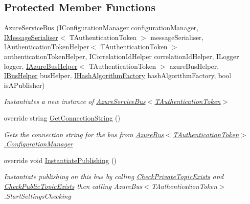 \subsection*{Protected Member Functions}
\begin{DoxyCompactItemize}
\item 
\hyperlink{classCqrs_1_1Azure_1_1ServiceBus_1_1AzureServiceBus_a09e34bafdb96fb8136efa428df9f80b2_a09e34bafdb96fb8136efa428df9f80b2}{Azure\+Service\+Bus} (\hyperlink{interfaceCqrs_1_1Configuration_1_1IConfigurationManager}{I\+Configuration\+Manager} configuration\+Manager, \hyperlink{interfaceCqrs_1_1Azure_1_1ServiceBus_1_1IMessageSerialiser}{I\+Message\+Serialiser}$<$ T\+Authentication\+Token $>$ message\+Serialiser, \hyperlink{interfaceCqrs_1_1Authentication_1_1IAuthenticationTokenHelper}{I\+Authentication\+Token\+Helper}$<$ T\+Authentication\+Token $>$ authentication\+Token\+Helper, I\+Correlation\+Id\+Helper correlation\+Id\+Helper, I\+Logger logger, \hyperlink{interfaceCqrs_1_1Azure_1_1ServiceBus_1_1IAzureBusHelper}{I\+Azure\+Bus\+Helper}$<$ T\+Authentication\+Token $>$ azure\+Bus\+Helper, \hyperlink{interfaceCqrs_1_1Bus_1_1IBusHelper}{I\+Bus\+Helper} bus\+Helper, \hyperlink{interfaceCqrs_1_1Bus_1_1IHashAlgorithmFactory}{I\+Hash\+Algorithm\+Factory} hash\+Algorithm\+Factory, bool is\+A\+Publisher)
\begin{DoxyCompactList}\small\item\em Instantiates a new instance of \hyperlink{classCqrs_1_1Azure_1_1ServiceBus_1_1AzureServiceBus_a09e34bafdb96fb8136efa428df9f80b2_a09e34bafdb96fb8136efa428df9f80b2}{Azure\+Service\+Bus$<$\+T\+Authentication\+Token$>$} \end{DoxyCompactList}\item 
override string \hyperlink{classCqrs_1_1Azure_1_1ServiceBus_1_1AzureServiceBus_a5a3b3610dc5dfebe586262c0bc787748_a5a3b3610dc5dfebe586262c0bc787748}{Get\+Connection\+String} ()
\begin{DoxyCompactList}\small\item\em Gets the connection string for the bus from \hyperlink{classCqrs_1_1Azure_1_1ServiceBus_1_1AzureBus_aaf9469d220fb23cb0521fa76b25ab228_aaf9469d220fb23cb0521fa76b25ab228}{Azure\+Bus$<$\+T\+Authentication\+Token$>$.\+Configuration\+Manager} \end{DoxyCompactList}\item 
override void \hyperlink{classCqrs_1_1Azure_1_1ServiceBus_1_1AzureServiceBus_a5c286d29b0bbfe3770f3407efda57036_a5c286d29b0bbfe3770f3407efda57036}{Instantiate\+Publishing} ()
\begin{DoxyCompactList}\small\item\em Instantiate publishing on this bus by calling \hyperlink{classCqrs_1_1Azure_1_1ServiceBus_1_1AzureServiceBus_ab0cafe4b76db0e35dce9b04cba464c50_ab0cafe4b76db0e35dce9b04cba464c50}{Check\+Private\+Topic\+Exists} and \hyperlink{classCqrs_1_1Azure_1_1ServiceBus_1_1AzureServiceBus_a4938623573b2aa81b295a247cb76c9ff_a4938623573b2aa81b295a247cb76c9ff}{Check\+Public\+Topic\+Exists} then calling Azure\+Bus$<$\+T\+Authentication\+Token$>$.\+Start\+Settings\+Checking \end{DoxyCompactList}\item 

\end{DoxyCompactItemize}
